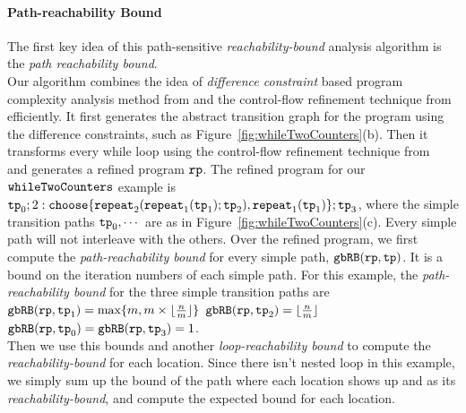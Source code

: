 \paragraph{Path-reachability Bound}
The first key idea of this path-sensitive \emph{reachability-bound} analysis algorithm is the \emph{path reachability bound}.
\\
Our algorithm combines the idea of \emph{difference constraint} based program complexity analysis method from \cite{sinn2017complexity}
and the control-flow refinement technique from~\cite{GulwaniJK09} efficiently.
It first
generates the abstract transition graph for the program using the difference constraints, such as Figure~\ref{fig:whileTwoCounters}(b).
Then it transforms every while loop using the control-flow refinement technique from~\cite{GulwaniJK09} and generates a refined program ${\mathtt{rp}}$.
% 
The refined program for our ${\mathtt{whileTwoCounters}}$ example is
$
  \tpath_0 ; 
  2: \rpchoose{\rprepeat_2(\rprepeat_1(\tpath_1); \tpath_2) , 
  \rprepeat_1(\tpath_1) }; \tpath_3
$, where the simple transition paths ${\mathtt{tp}}_0, \cdots$ are as in Figure~\ref{fig:whileTwoCounters}(c).
Every simple path will not interleave with the others. 
Over the refined program, we first compute the \emph{path-reachability bound} for every simple path,
${\mathtt{gbRB}}({\mathtt{rp}}, {\mathtt{tp}})$.
It is a bound on the iteration numbers of each simple path.
For this example, the \emph{path-reachability bound} for the three simple transition paths are
${\mathtt{gbRB}}({\mathtt{rp}}, {\mathtt{tp}}_1) = \max\{m, m \times \lfloor\frac{n}{m}\rfloor\}$ \quad
${\mathtt{gbRB}}({\mathtt{rp}}, {\mathtt{tp}}_2) = \lfloor\frac{n}{m}\rfloor$ \quad
${\mathtt{gbRB}}({\mathtt{rp}}, {\mathtt{tp}}_0) = {\mathtt{gbRB}}({\mathtt{rp}}, {\mathtt{tp}}_3) = 1$.
\\
Then we use this bounds
and another \emph{loop-reachability bound}
to compute the \emph{reachability-bound} for each location.
Since there isn't nested loop in this example, we simply sum up the bound of the path where each location shows up
and as its \emph{reachability-bound}, and compute the expected bound for each location.
%
